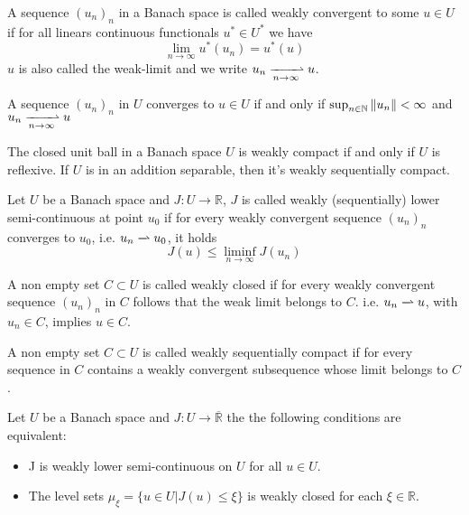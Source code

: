 \begin{definition}
	A sequence $(u_n)_n$ in a Banach space is called weakly convergent to some $u\in U$ if for all linears continuous functionals $u^* \in U^*$ we have
	\[
		\lim_{n\rightarrow \infty}u^*(u_n)=u^*(u)
	\]
	$u$ is also called the weak-limit and we write $u_n \xrightharpoonup[n\rightarrow\infty]{} u$.
\end{definition}

\begin{theorem}
	A sequence $(u_n)_n$ in $U$ converges to $u\in U$ if and only if $\sup_{n\in \mathbb{N}} \left\lVert u_n\right\rVert < \infty $ and $u_n \xrightharpoonup[n\rightarrow \infty]{}u$
\end{theorem}
\begin{theorem}
	The closed unit ball in a Banach space $U$ is weakly compact if and only if $U$ is reflexive. If $U$ is in an addition separable, then it's weakly sequentially compact.
\end{theorem}

\begin{definition}
	Let $U$ be a Banach space and $J: U \rightarrow \mathbb{R}$, $J$ is called weakly (sequentially) lower semi-continuous at point $u_0$ if for every weakly convergent sequence $(u_n)_n$ converges to $u_0$, i.e. $u_n \xrightharpoonup[]{} u_0$, it holds \[J(u)\leq \liminf_{n\rightarrow \infty} J(u_n)\]
\end{definition}

\begin{definition}
	A non empty set $C\subset U$ is called weakly closed if for every weakly convergent sequence $(u_n)_n$ in $C$ follows that the weak limit belongs to $C$. i.e. $u_n \xrightharpoonup[]{} u$, with $u_n \in C$, implies $u\in C$.
\end{definition}

\begin{definition}
	A non empty set $C\subset U$ is called weakly sequentially compact if for every sequence in $C$ contains a weakly convergent subsequence whose limit belongs to $C$.
\end{definition}

\begin{theorem}
	\label{th4. wlsc and level sets.}
	Let $U$ be a Banach space and $J:U \rightarrow \overline{\mathbb{R}}$ the the following conditions are equivalent:
	\begin{itemize}
		\item J is weakly lower semi-continuous on $U$ for all $u\in U$.
		\item The level sets $\mu_\xi = \lbrace u \in U | J(u)\leq \xi \rbrace$ is weakly closed for each $\xi \in \mathbb{R}$.
	\end{itemize}
\end{theorem}

